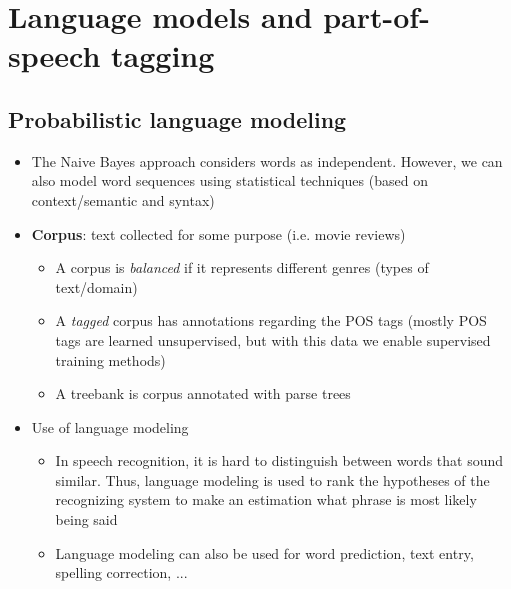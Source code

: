 \section{Language models and part-of-speech tagging}
\subsection{Probabilistic language modeling}
\begin{itemize}
	\item The Naive Bayes approach considers words as independent. However, we can also model word sequences using statistical techniques (based on context/semantic and syntax)
	\item \textbf{Corpus}: text collected for some purpose (i.e. movie reviews)
	\begin{itemize}
		\item A corpus is \textit{balanced} if it represents different genres (types of text/domain)
		\item A \textit{tagged} corpus has annotations regarding the POS tags (mostly POS tags are learned unsupervised, but with this data we enable supervised training methods)
		\item A treebank is corpus annotated with parse trees
	\end{itemize}
	\item Use of language modeling
	\begin{itemize}
		\item In speech recognition, it is hard to distinguish between words that sound similar. Thus, language modeling is used to rank the hypotheses of the recognizing system to make an estimation what phrase is most likely being said
		\item Language modeling can also be used for word prediction, text entry, spelling correction, ...
	\end{itemize}
\end{itemize}
